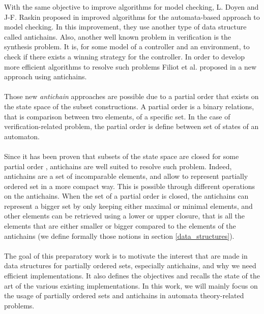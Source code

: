 \documentclass[11pt,a4paper]{article}
\theoremstyle{definition}
\begin{document}
With the same objective to improve algorithms for model checking,
L. Doyen and J-F. Raskin proposed
in \cite{grumberg_improved_2007} improved algorithms
for the automata-based approach to model checking.
In this improvement, they use another type of data structure
called antichains.
Also, another well known problem in verification is the synthesis problem.
It is, for
some model of a controller and an environment,
to check if there exists a winning strategy for the controller.
In order to develop more efficient algorithms to resolve such
problems Filiot et al. proposed in \cite{ltl_rea} a new approach
using antichains.

\paragraph{}


Those new \textit{antichain} approaches
are possible due to a partial order that exists on the state
space of the subset constructions.
A partial order is a binary relations,
that is comparison between two elements,
of a specific set.
In the case of verification-related
problem, the partial order is define
between set of states of an automaton.

\paragraph{}

Since it has been
proven that subsets of the
state space are closed for some partial order
\cite{grumberg_improved_2007, AC_universality},
antichains are well suited to resolve such problem.
Indeed, antichains are a set of incomparable elements, and
allow to represent partially ordered set in a more compact way.
This is possible through different operations on the antichains.
When the set of a partial order is closed, the antichains
can represent a bigger set by only keeping
either maximal or minimal elements,
and other elements can be retrieved using a lower or upper closure,
that is all the elements that are either smaller or bigger
compared to the elements of the antichains
(we define formally
those notions in section \ref{data_structures}).

\paragraph{}

The goal of this preparatory work is to motivate the interest that
are made in data structures for partially ordered sets,
especially antichains,
and why we need efficient
implementations.
It also defines the objectives
and recalls the state of the art of the various existing implementations.
In this work, we will mainly focus
on the usage of partially ordered sets and antichains in
automata theory-related problems.
\end{document}
